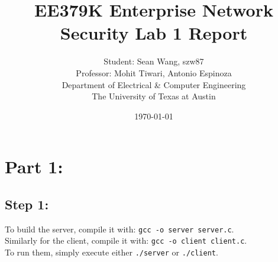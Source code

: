 \documentclass[11pt]{article}
\author{Student: Sean Wang, szw87 \\ Professor: Mohit Tiwari, Antonio Espinoza \\ Department of Electrical \& Computer Engineering \\ The University of Texas at Austin}
\date{\today}
\title{EE379K Enterprise Network Security Lab 1 Report}
\begin{document}
\maketitle
\section*{Part 1:}
\subsection*{Step 1:}
To build the server, compile it with: \verb|gcc -o server server.c|.\\
Similarly for the client, compile it with: \verb|gcc -o client client.c|.\\
To run them, simply execute either \verb|./server| or \verb|./client|.
\end{document}
